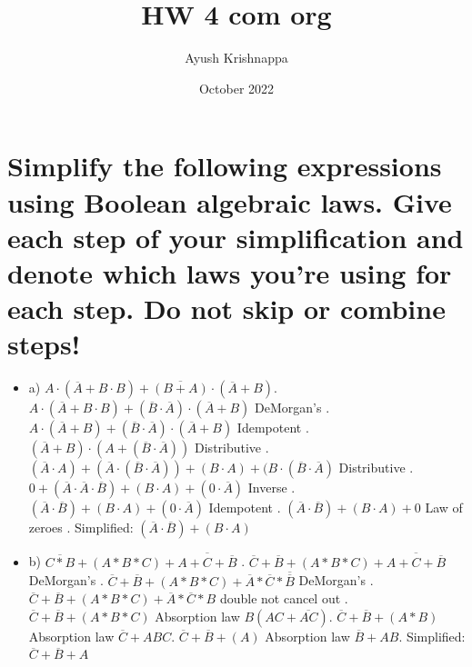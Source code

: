 \documentclass{article}
\title{HW 4 com org}
\author{Ayush Krishnappa}
\date{October 2022}
\begin{document}
\maketitle

\section{Simplify the following expressions using Boolean algebraic laws. Give each step of your simplification and denote which laws you’re using for each step. Do not skip or combine steps!
}

\begin{itemize}
\large
    \item a) $A \cdot (\overline{A} + B \cdot B) + \overline{(B + A)} \cdot (\overline{A} + B)$. $A \cdot (\overline{A} + B \cdot B) + (\overline{B} \cdot \overline{A}) \cdot (\overline{A} + B)$ DeMorgan's . $A \cdot (\overline{A} + B) + (\overline{B} \cdot \overline{A}) \cdot (\overline{A} + B)$ Idempotent . $(\overline{A} + B) \cdot (A + (\overline{B} \cdot \overline{A}))$ Distributive . $(\overline{A} \cdot A) + (\overline{A} \cdot (\overline{B} \cdot \overline{A})) + (B \cdot A) + (B \cdot (\overline{B} \cdot \overline{A})$ Distributive . $0 + (\overline{A} \cdot \overline{A} \cdot \overline{B}) + (B \cdot A) + (0 \cdot \overline{A})$ Inverse . $(\overline{A} \cdot \overline{B}) + (B \cdot A) + (0 \cdot \overline{A})$ Idempotent . $(\overline{A} \cdot \overline{B}) + (B \cdot A) + 0$ Law of zeroes . Simplified: $(\overline{A} \cdot \overline{B}) + (B \cdot A)$ \newline
    
    \item b) $\overline{C*B} + (A * B * C) + \overline{A + C + \overline{B}}$ . $\overline{C} + \overline{B} + (A * B * C) + \overline{A + C + \overline{B}}$ DeMorgan's . $\overline{C} + \overline{B} + (A * B * C) + \overline{A} * \overline{C} * \overline{\overline{B}}$ DeMorgan's . $\overline{C} + \overline{B} + (A * B * C) + \overline{A} * \overline{C} * B$ double not cancel out . $\overline{C} + \overline{B} + (A * B * C)$ Absorption law $B(AC + \overline{AC})$. $\overline{C} + \overline{B} + (A * B)$ Absorption law $\overline{C} + ABC$. $\overline{C} + \overline{B} + (A)$ Absorption law $\overline{B} + AB$. Simplified: $\overline{C} + \overline{B} + A$ \newline
    

\end{itemize}
\end{document}
